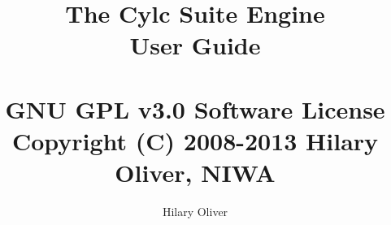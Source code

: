 \documentclass[titlepage]{article}
\begin{document}
\title{The Cylc Suite Engine\\
User Guide \\
\protect  \\
GNU GPL v3.0 Software License \\
Copyright (C) 2008-2013 Hilary Oliver, NIWA}

\author{Hilary Oliver}


\maketitle

%

\tableofcontents



\end{document}
